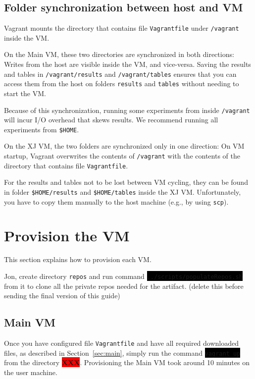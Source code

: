 \documentclass[12pt]{article}
\newcommand{\command}[1]{\colorbox{black}{\texttt{\color{white}#1}}}
\newcommand{\host}[1]{\colorbox{blue!20}{\texttt{\color{black}#1}}}
\newcommand{\vm}[1]{\colorbox{green!20}{\texttt{\color{black}#1}}}
\newcommand{\XXX}{\colorbox{red}{\bf\color{white}XXX}}
\begin{document}
\subsection{Folder synchronization between host and VM}
\label{sec:sync}

Vagrant mounts the directory that contains file \host{Vagrantfile} under
\vm{/vagrant} inside the VM.

On the Main VM, these two directories are synchronized in both directions:
Writes from the host are visible inside the VM, and vice-versa.  Saving the
results and tables in \vm{/vagrant/results} and \vm{/vagrant/tables}
ensures that you can access them from the host on folders \host{results} and
\host{tables} without needing to start the VM.

Because of this synchronization, running some experiments from inside
\vm{/vagrant} will incur I/O overhead that skews results.  We recommend
running all experiments from \vm{\$HOME}.

On the XJ VM, the two folders are synchronized only in one direction:  On VM
startup, Vagrant overwrites the contents of \vm{/vagrant} with the contents
of the directory that contains file \host{Vagrantfile}.

For the results and tables not to be lost between VM cycling, they can be found
in folder \vm{\$HOME/results} and \vm{\$HOME/tables} inside the XJ VM.
Unfortunately, you have to copy them manually to the host machine (e.g., by
using \texttt{scp}).

\section{Provision the VM}
\label{sec:provision}

This section explains how to provision each VM.

Jon, create directory \host{repos} and run command
\command{../scripts/populateRepos.sh} from it to clone all the private repos
needed for the artifact. (delete this before sending the final version of this
guide)

\subsection{Main VM}

Once you have configured file \host{Vagrantfile} and have all required
downloaded files, as described in Section~\ref{sec:main}, simply run the command
\command{vagrant up} from the directory \XXX.  Provisioning the Main VM took around 10
minutes on the user machine.
\end{document}
